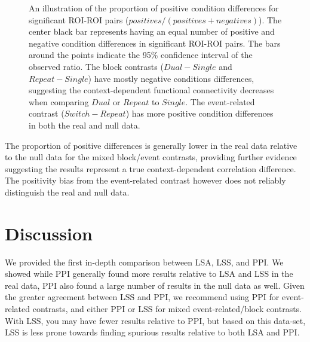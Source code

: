 \documentclass[phd,figures,tables,ackpage,abstractpage,publicabstractpage]{uithesis}
\begin{document}
\begin{figure}[H]
  \centering
  \hfill
  \vfill
  \hfill
  \caption[Proportion of positive condition differences in LSA/LSS/PPI using participant data]{
    An illustration of the proportion of positive condition differences
    for significant ROI-ROI pairs ($positives / (positives + negatives)$).
    The center black bar represents having an equal number of positive
    and negative condition differences in significant
    ROI-ROI pairs.
    The bars around the points indicate the 95\% confidence interval
    of the observed ratio.
    The block contrasts ($Dual - Single$ and $Repeat - Single$) have mostly
    negative conditions differences, suggesting the context-dependent functional
    connectivity decreases when comparing $Dual$ or $Repeat$ to $Single$.
    The event-related contrast ($Switch - Repeat$) has more positive
    condition differences in both the real and null data.
  }
\label{fig:positive_bias}
\end{figure}

The proportion of positive differences is generally lower in the real data relative
to the null data for the mixed block/event contrasts,
providing further evidence suggesting the results represent a true context-dependent
correlation difference.
The positivity bias from the event-related contrast however does not
reliably distinguish the real and null data.

\section{Discussion}
We provided the first in-depth comparison between LSA, LSS, and PPI.
We showed while PPI generally found more results relative to LSA and LSS in the real data,
PPI also found a large number of results in the null data as well.
Given the greater agreement between LSS and PPI, we recommend using PPI
for event-related contrasts, and either PPI or LSS for mixed event-related/block contrasts.
With LSS, you may have fewer results relative to PPI, but based on this data-set,
LSS is less prone towards finding spurious results relative to both LSA and PPI.
\end{document}
